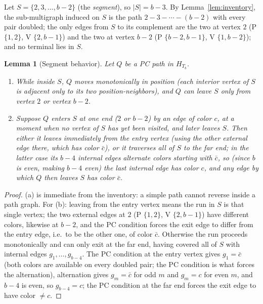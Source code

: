\documentclass[11pt]{article}
\newtheorem{lemma}[theorem]{Lemma}
\theoremstyle{definition}
\begin{document}
Let $S = \{2, 3, \dots, b-2\}$ (the \emph{segment}), so $|S| = b - 3$. By
Lemma~\ref{lem:inventory}, the sub-multigraph induced on $S$ is the path
$2 - 3 - \cdots - (b-2)$ with every pair doubled; the only edges from $S$ to its
complement are the two at vertex $2$ (P $\{1,2\}$, V $\{2,b-1\}$) and the two at
vertex $b-2$ (P $\{b-2,b-1\}$, V $\{1,b-2\}$); and no terminal lies in $S$.

\begin{lemma}[Segment behavior]\label{lem:segment}
Let $Q$ be a PC path in $H_{T_b}$.
\begin{enumerate}
\item[(a)] While inside $S$, $Q$ moves monotonically in position (each interior
vertex of $S$ is adjacent only to its two position-neighbors), and $Q$ can leave $S$
only from vertex $2$ or vertex $b-2$.
\item[(b)] Suppose $Q$ enters $S$ at one end ($2$ or $b-2$) by an edge of color $c$,
at a moment when no vertex of $S$ has yet been visited, and later leaves $S$. Then
either it leaves immediately from the entry vertex (using the other external edge
there, which has color $\bar c$), or it traverses all of $S$ to the far end; in the
latter case its $b-4$ internal edges alternate colors starting with $\bar c$, so
(since $b$ is even, making $b - 4$ even) the last internal edge has color $c$, and
any edge by which $Q$ then leaves $S$ has color $\bar c$.
\end{enumerate}
\end{lemma}

\begin{proof}
(a) is immediate from the inventory: a simple path cannot reverse inside a path
graph. For (b): leaving from the entry vertex means the run in $S$ is that single
vertex; the two external edges at $2$ (P $\{1,2\}$, V $\{2,b-1\}$) have different
colors, likewise at $b-2$, and the PC condition forces the exit edge to differ from
the entry edge, i.e.\ to be the other one, of color $\bar c$. Otherwise the run
proceeds monotonically and can only exit at the far end, having covered all of $S$
with internal edges $g_1, \dots, g_{b-4}$. The PC condition at the entry vertex gives
$g_1 = \bar c$ (both colors are available on every doubled pair; the PC condition is
what forces the alternation), alternation gives $g_m = \bar c$ for odd $m$ and
$g_m = c$ for even $m$, and $b - 4$ is even, so $g_{b-4} = c$; the PC condition at
the far end forces the exit edge to have color $\ne c$.
\end{proof}
\end{document}
